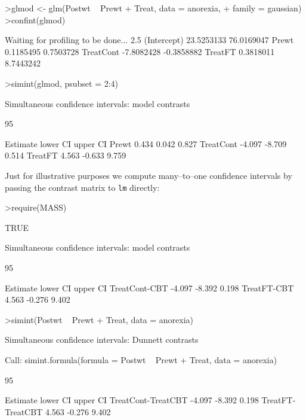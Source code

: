 \documentclass{article}
\begin{document}
\begin{Schunk}
\begin{Sinput}
>glmod <- glm(Postwt ~ Prewt + Treat, data = anorexia, 
+     family = gaussian)
>confint(glmod)
\end{Sinput}
\begin{Soutput}
Waiting for profiling to be done...
                 2.5 %     97.5 %
(Intercept) 23.5253133 76.0169047
Prewt        0.1185495  0.7503728
TreatCont   -7.8082428 -0.3858882
TreatFT      0.3818011  8.7443242
\end{Soutput}
\begin{Sinput}
>simint(glmod, psubset = 2:4)
\end{Sinput}
\begin{Soutput}
	Simultaneous confidence intervals: model contrasts

	95 % confidence intervals

          Estimate lower CI upper CI
Prewt        0.434    0.042    0.827
TreatCont   -4.097   -8.709    0.514
TreatFT      4.563   -0.633    9.759
\end{Soutput}
\end{Schunk}
\normalsize

Just for illustrative purposes we compute many--to--one confidence intervals
by passing the contrast matrix to \texttt{lm} directly:
\small
\begin{Schunk}
\begin{Sinput}
>require(MASS)
\end{Sinput}
\begin{Soutput}
[1] TRUE
\end{Soutput}
\begin{Soutput}
	Simultaneous confidence intervals: model contrasts

	95 % confidence intervals

              Estimate lower CI upper CI
TreatCont-CBT   -4.097   -8.392    0.198
TreatFT-CBT      4.563   -0.276    9.402
\end{Soutput}
\begin{Sinput}
>simint(Postwt ~ Prewt + Treat, data = anorexia)
\end{Sinput}
\begin{Soutput}
	Simultaneous confidence intervals: Dunnett
	contrasts

Call: 
simint.formula(formula = Postwt ~ Prewt + Treat, data = anorexia)

	95 % confidence intervals

                   Estimate lower CI upper CI
TreatCont-TreatCBT   -4.097   -8.392    0.198
TreatFT-TreatCBT      4.563   -0.276    9.402
\end{Soutput}
\end{Schunk}
\normalsize
\end{document}
